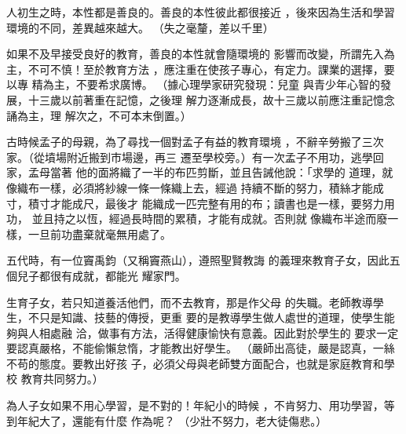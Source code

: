 \documentclass[avery5371,grid]{flashcards}
\begin{document}
\docshowcopyright
{}

{人初生之時，本性都是善良的。善良的本性彼此都很接近
，後來因為生活和學習環境的不同，差異越來越大。} %
{（失之毫釐，差以千里）} %

{如果不及早接受良好的教育，善良的本性就會隨環境的
影響而改變，所謂先入為主，不可不慎！至於教育方法
，應注重在使孩子專心，有定力。課業的選擇，要以專
精為主，不要希求廣博。} %
{（據心理學家研究發現：兒童
與青少年心智的發展，十三歲以前著重在記憶，之後理
解力逐漸成長，故十三歲以前應注重記憶念誦為主，理
解次之，不可本末倒置。）} %

{古時候孟子的母親，為了尋找一個對孟子有益的教育環境
，不辭辛勞搬了三次家。（從墳場附近搬到市場邊，再三
遷至學校旁。）有一次孟子不用功，逃學回家，孟母當著
他的面將織了一半的布匹剪斷，並且告誡他說：「求學的
道理，就像織布一樣，必須將紗線一條一條織上去，經過
持續不斷的努力，積絲才能成寸，積寸才能成尺，最後才
能織成一匹完整有用的布；讀書也是一樣，要努力用功，
並且持之以恆，經過長時間的累積，才能有成就。否則就
像織布半途而廢一樣，一旦前功盡棄就毫無用處了。} %
{} %

{五代時，有一位竇禹鈞（又稱竇燕山），遵照聖賢教誨
的義理來教育子女，因此五個兒子都很有成就，都能光
耀家門。} %
{} %

{生育子女，若只知道養活他們，而不去教育，那是作父母
的失職。老師教導學生，不只是知識、技藝的傳授，更重
要的是教導學生做人處世的道理，使學生能夠與人相處融
洽，做事有方法，活得健康愉快有意義。因此對於學生的
要求一定要認真嚴格，不能偷懶怠惰，才能教出好學生。} %
{（嚴師出高徒，嚴是認真，一絲不苟的態度。要教出好孩
子，必須父母與老師雙方面配合，也就是家庭教育和學校
教育共同努力。）} %




{為人子女如果不用心學習，是不對的！年紀小的時候
，不肯努力、用功學習，等到年紀大了，還能有什麼
作為呢？} %
{（少壯不努力，老大徒傷悲。）} %
\end{document}
